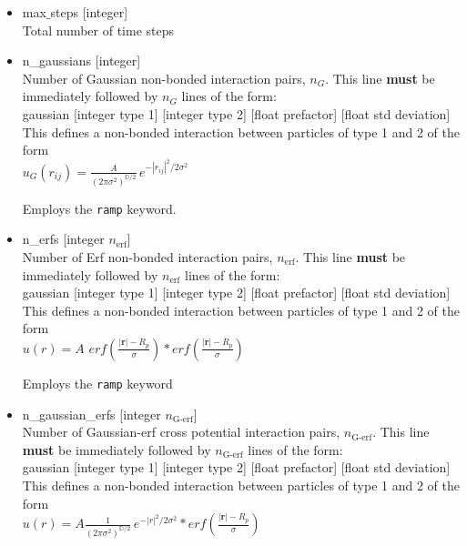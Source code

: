 \documentclass[12pt]{article}
\begin{document}
\begin{itemize}
	
	
	\item
	max$\_$steps [integer]
	\\[8pt]
	Total number of time steps
    

  \item
    n\_gaussians [integer]
    \\[8pt]
    Number of Gaussian non-bonded interaction pairs, $n_G$. This line {\bf must} be immediately followed by $n_G$ lines of the form:
    \\[8pt]
    gaussian [integer type 1] [integer type 2] [float prefactor] [float std deviation]
    \\[8pt]
    This defines a non-bonded interaction between particles of type 1 and 2 of the form 
    \\
	$u_G(r_{ij}) = \frac{A}{(2\pi \sigma^2)^{\mathbb D/2} }\, e^{-|r_{ij}|^2/2\sigma^2}$

	Employs the \verb+ramp+ keyword.
	
  \item
    n\_erfs [integer $n_\text{erf}$]
    \\[8pt]
    Number of Erf non-bonded interaction pairs, $n_\text{erf}$. This line {\bf must} be immediately followed by $n_\text{erf}$ lines of the form:
    \\[8pt]
    gaussian [integer type 1] [integer type 2] [float prefactor] [float std deviation]
    \\[8pt]
    This defines a non-bonded interaction between particles of type 1 and 2 of the form 
    \\
	$u(r) = A  \,\, erf\left(\frac{\vert\mathbf{r}\vert - R_p}{\sigma}\right) * erf\left(\frac{\vert\mathbf{r}\vert - R_p}{\sigma}\right)$

	Employs the \verb+ramp+ keyword
	
  \item
    n\_gaussian\_erfs [integer $n_\text{G-erf}$]
    \\[8pt]
    Number of Gaussian-erf cross potential interaction pairs, $n_\text{G-erf}$. This line {\bf must} be immediately followed by $n_\text{G-erf}$ lines of the form:
    \\[8pt]
    gaussian [integer type 1] [integer type 2] [float prefactor] [float std deviation]
    \\[8pt]
    This defines a non-bonded interaction between particles of type 1 and 2 of the form 
    \\
    $u(r) = A \frac{1}{(2\pi \sigma^2)^{\mathbb D/2} }\, e^{-|r|^2/2\sigma^2}* erf\left(\frac{\vert\mathbf{r}\vert - R_p}{\sigma}\right)$


\end{itemize}
\end{document}
